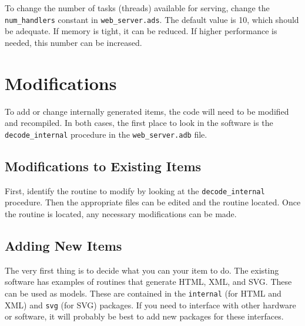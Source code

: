 \documentclass[10pt, openany, draft]{article}
\begin{document}
To change the number of tasks (threads) available for serving, change the \texttt{num\_handlers} constant in \texttt{web\_server.ads}.  The default value is 10, which should be adequate.  If memory is tight, it can be reduced. If higher performance is needed, this number can be increased.

\section{Modifications}
To add or change internally generated items, the code will need to be modified and recompiled.  In both cases, the first place to look in the software is the \texttt{decode\_internal} procedure in the \texttt{web\_server.adb} file.

\subsection{Modifications to Existing Items}
First, identify the routine to modify by looking at the \texttt{decode\_internal} procedure.  Then the appropriate files can be edited and the routine located.  Once the routine is located, any necessary modifications can be made.

\subsection{Adding New Items}
The very first thing is to decide what you can your item to do.  The existing software has examples of routines that generate HTML, XML, and SVG.  These can be used as models.  These are contained in the \texttt{internal} (for HTML and XML) and \texttt{svg} (for SVG) packages.  If you need to interface with other hardware or software, it will probably be best to add new packages for these interfaces.
\end{document}
